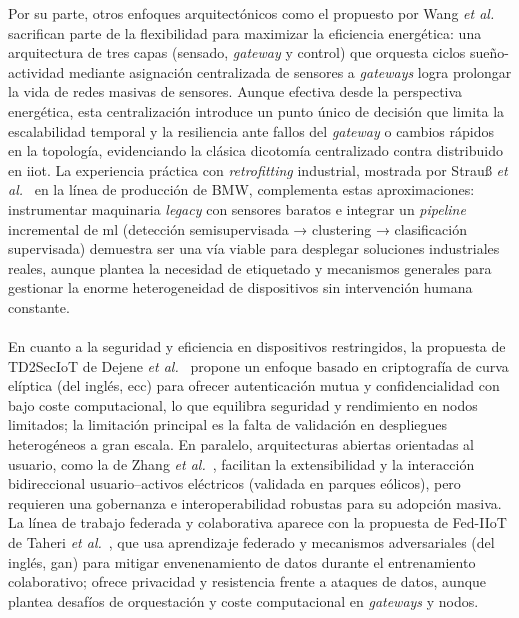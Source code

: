 Por su parte, otros enfoques arquitectónicos como el propuesto por Wang \textit{et al.}~\cite{wang2016green} sacrifican parte de la flexibilidad para maximizar la eficiencia energética: una arquitectura de tres capas (sensado, \textit{gateway} y control) que orquesta ciclos sueño-actividad mediante asignación centralizada de sensores a \textit{gateways} logra prolongar la vida de redes masivas de sensores. Aunque efectiva desde la perspectiva energética, esta centralización introduce un punto único de decisión que limita la escalabilidad temporal y la resiliencia ante fallos del \textit{gateway} o cambios rápidos en la topología, evidenciando la clásica dicotomía centralizado contra distribuido en \gls{iiot}. La experiencia práctica con \textit{retrofitting} industrial, mostrada por Strauß \textit{et al.}~\cite{strauss2018enabling} en la línea de producción de BMW, complementa estas aproximaciones: instrumentar maquinaria \textit{legacy} con sensores baratos e integrar un \textit{pipeline} incremental de \gls{ml} (detección semisupervisada → clustering → clasificación supervisada) demuestra ser una vía viable para desplegar soluciones industriales reales, aunque plantea la necesidad de etiquetado y mecanismos generales para gestionar la enorme heterogeneidad de dispositivos sin intervención humana constante.\\
\\
En cuanto a la seguridad y eficiencia en dispositivos restringidos, la propuesta de TD2SecIoT de Dejene \textit{et al.}~\cite{dejene2020td2seciot} propone un enfoque basado en criptografía de curva elíptica (del inglés, \gls{ecc}) para ofrecer autenticación mutua y confidencialidad con bajo coste computacional, lo que equilibra seguridad y rendimiento en nodos limitados; la limitación principal es la falta de validación en despliegues heterogéneos a gran escala. En paralelo, arquitecturas abiertas orientadas al usuario, como la de Zhang \textit{et al.}~\cite{zhang2020open}, facilitan la extensibilidad y la interacción bidireccional usuario–activos eléctricos (validada en parques eólicos), pero requieren una gobernanza e interoperabilidad robustas para su adopción masiva. La línea de trabajo federada y colaborativa aparece con la propuesta de Fed-IIoT de Taheri \textit{et al.}~\cite{taheri2020fed}, que usa aprendizaje federado y mecanismos adversariales (del inglés, \gls{gan}) para mitigar envenenamiento de datos durante el entrenamiento colaborativo; ofrece privacidad y resistencia frente a ataques de datos, aunque plantea desafíos de orquestación y coste computacional en \textit{gateways} y nodos.\\
